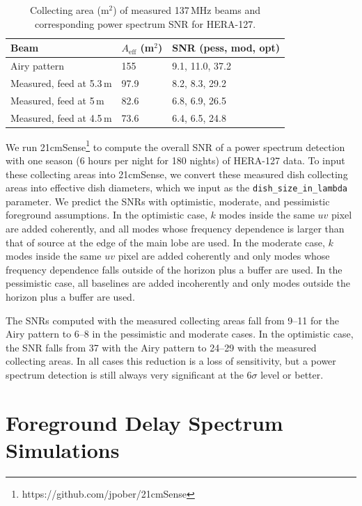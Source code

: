 \documentclass{emulateapj}
\begin{document}
 \begin{table}[h]
 \caption{ \label{table:collectingareatable}Collecting area (m$^2$) of measured 137\,MHz beams and corresponding power spectrum SNR for HERA-127.}
\begin{tabular}{| l | l | l |}
\hline
Beam & $A_\text{eff}$ (m$^2$) & SNR (pess, mod, opt)\\
\hline
  Airy pattern & 155 & 9.1, 11.0, 37.2  \\
    Measured, feed at 5.3\,m & 97.9 & 8.2, 8.3, 29.2 \\
    Measured, feed at 5\,m & 82.6 & 6.8, 6.9, 26.5 \\
    Measured, feed at 4.5\,m & 73.6 & 6.4, 6.5, 24.8 \\ 
  \hline
\end{tabular}
\end{table}

We run 21cmSense\footnote{https://github.com/jpober/21cmSense} to compute the overall SNR of a power spectrum detection with one season (6 hours per night for 180 nights) of HERA-127 data. To input these collecting areas into 21cmSense, we convert these measured dish collecting areas into effective dish diameters, which we input as the \texttt{dish\_size\_in\_lambda} parameter. We predict the SNRs with optimistic, moderate, and pessimistic foreground assumptions. In the optimistic case, $k$ modes inside the same $uv$ pixel are added coherently, and all modes whose frequency dependence is larger than that of source at the edge of the main lobe are used. In the moderate case, $k$ modes inside the same $uv$ pixel are added coherently and only modes whose frequency dependence falls outside of the horizon plus a buffer are used. In the pessimistic case, all baselines are added incoherently and only modes outside the horizon plus a buffer are used.

The SNRs computed with the measured collecting areas fall from 9--11 for the Airy pattern  to 6--8 in the pessimistic and moderate cases. In the optimistic case, the SNR falls from 37 with the Airy pattern to 24--29 with the measured collecting areas. In all cases this reduction is a loss of sensitivity, but a power spectrum detection is still always very significant at the 6$\sigma$ level or better.

\section{Foreground Delay Spectrum Simulations}
\label{sec:foregrounds}
\end{document}
